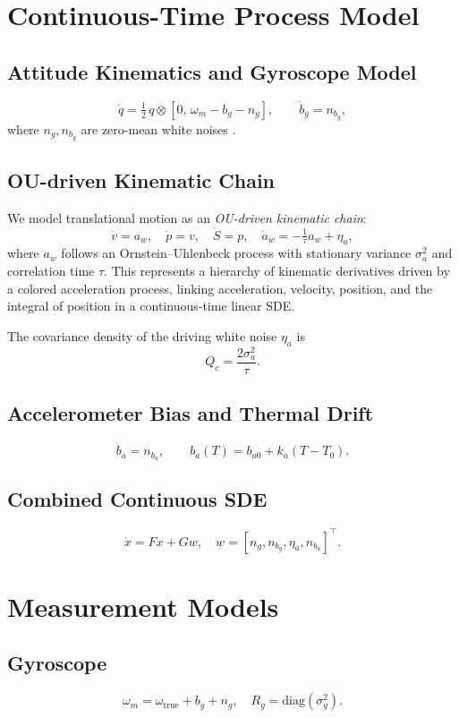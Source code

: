 \documentclass[10pt]{extarticle}
\begin{document}
\section{Continuous-Time Process Model}
\label{sec:process}

\subsection{Attitude Kinematics and Gyroscope Model}
\[
\dot q = \tfrac12\,q\otimes[0,\,\omega_m - b_g - n_g], \qquad
\dot b_g = n_{b_g},
\]
where $n_g,n_{b_g}$ are zero-mean white noises
\cite{crassidis2012,maybeck1979}.

\subsection{OU-driven Kinematic Chain}
We model translational motion as an \emph{OU-driven kinematic chain}:
\[
\dot v = a_w,\quad
\dot p = v,\quad
\dot S = p,\quad
\dot a_w = -\tfrac{1}{\tau}a_w + \eta_a,
\]
where $a_w$ follows an Ornstein–Uhlenbeck process with stationary variance $\sigma_a^2$
and correlation time $\tau$.
This represents a hierarchy of kinematic derivatives driven by a colored acceleration process,
linking acceleration, velocity, position, and the integral of position in a continuous-time linear SDE.

The covariance density of the driving white noise $\eta_a$ is
\[
Q_c = \frac{2\sigma_a^2}{\tau}.
\]
\cite{uhlenbeck1930,brown2012}

\subsection{Accelerometer Bias and Thermal Drift}
\[
\dot b_a = n_{b_a}, \qquad b_a(T)=b_{a0}+k_a(T-T_0).
\]

\subsection{Combined Continuous SDE}
\[
\dot x = F x + G w, \quad w=[n_g,n_{b_g},\eta_a,n_{b_a}]^\top.
\]

\section{Measurement Models}
\label{sec:measurements}

\subsection{Gyroscope}
\[
\omega_m = \omega_\text{true} + b_g + n_g,\quad R_g=\mathrm{diag}(\sigma_g^2).
\]
\end{document}

